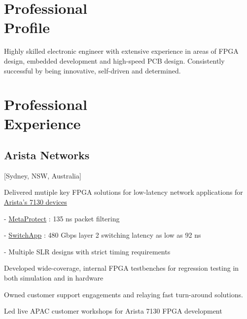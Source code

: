 \documentclass{mycv}
\begin{document}
\newcommand{\SubItem}[1]{
    {\setlength\itemindent{15pt} \item[-] #1}
}

\maketitle%

\section{Professional \\ Profile}

Highly skilled electronic engineer with extensive experience in areas of FPGA design, embedded development and high-speed PCB design. 
Consistently successful by being innovative, self-driven and determined.

\section{Professional \\ Experience}

\subsection{Arista Networks}[Sydney, NSW, Australia]
\begin{positions}
\end{positions}

\begin{itemize}[noitemsep]
  \item Delivered mutiple key FPGA solutions for low-latency network applications for \href{https://www.arista.com/en/products/7130-network-applications-quick-look}{Arista's 7130 devices}
    \SubItem{\href{https://www.arista.com/assets/data/pdf/ProductBrief-MetaProtect-Firewall.pdf}{MetaProtect} : 135 ns packet filtering}
    \SubItem{\href{https://www.arista.com/assets/data/pdf/ProductBrief-SwitchApp.pdf}{SwitchApp} : 480 Gbps layer 2 switching latency as low as 92 ns}
    \SubItem{Multiple SLR designs with strict timing requirements}
  \item Developed wide-coverage, internal FPGA testbenches for regression testing in both simulation and in hardware
  \item Owned customer support engagements and relaying fast turn-around solutions.
  \item Led live APAC customer workshops for Arista 7130 FPGA development
\end{itemize}
\end{document}
